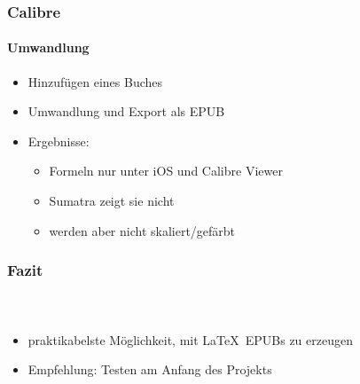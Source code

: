\documentclass[12pt,ngerman]{beamer}
\begin{document}
\begin{frame}
\frametitle{Calibre}
\framesubtitle{Umwandlung}

\begin{itemize}
\item Hinzufügen eines Buches
\item Umwandlung und Export als EPUB
\item Ergebnisse:
\begin{itemize}
	\item Formeln nur unter iOS und Calibre Viewer
	\item Sumatra zeigt sie nicht
	\item werden aber nicht skaliert/gefärbt
\end{itemize}
\end{itemize}
\end{frame}

\begin{frame}
\frametitle{Fazit}
\framesubtitle{~}

\begin{itemize}
\item praktikabelste Möglichkeit, mit \LaTeX\ EPUBs zu erzeugen
\item Empfehlung: Testen am Anfang des Projekts
\end{itemize}
\end{frame}
\end{document}
